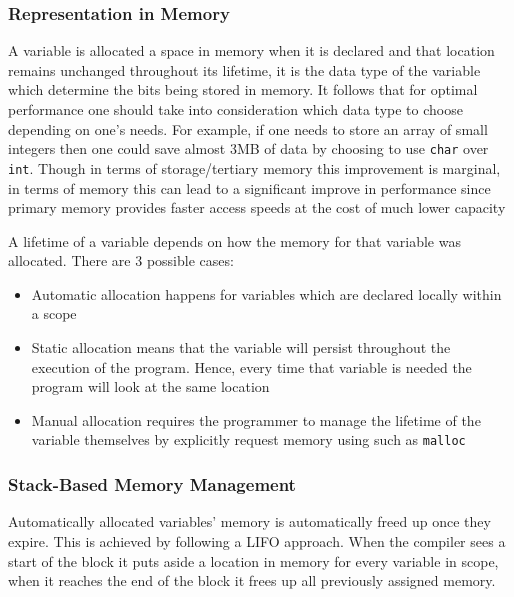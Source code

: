 
\subsubsection{Representation in Memory}

\par{A variable is allocated a space in memory when it is declared and that location remains unchanged throughout
its lifetime, it is the data type of the variable which determine the bits being stored in memory.
It follows that for optimal performance one should take into consideration which data type to choose
depending on one's needs. For example, if one needs to store an array of small integers then one
could save almost 3MB of data by choosing to use \texttt{char} over \texttt{int}. Though in terms of
storage/tertiary memory this improvement is marginal, in terms of memory this can lead to a significant improve in
performance since primary memory provides faster access speeds at the cost of much lower capacity} 
\par{A lifetime of a variable depends on how the memory for that variable was allocated. There
are 3 possible cases:}
\begin{itemize}
	\item Automatic allocation happens for variables which are declared locally within a scope
	\item Static allocation means that the variable will persist throughout the execution of
	the program. Hence, every time that variable is needed the program will look at the same location
	\item Manual allocation requires the programmer to manage the lifetime of the variable
	themselves by  explicitly request memory using  such as \texttt{malloc}
\end{itemize}

\subsubsection{Stack-Based Memory Management}
\par{Automatically allocated variables' memory is automatically freed up once they expire. This
is achieved by following a LIFO  approach. When the compiler sees a
start of the block it puts aside a location in memory for every variable in scope, when it reaches
the end of the block it frees up all previously assigned memory.}

